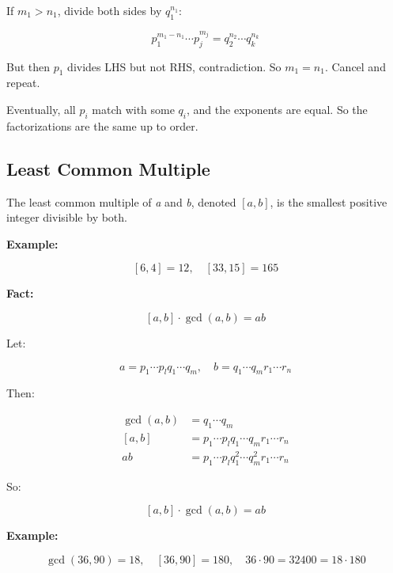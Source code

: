 If \(m_1 > n_1\), divide both sides by \(q_1^{n_1}\):

\[
	p_1^{m_1-n_1} \cdots p_j^{m_j} = q_2^{n_2} \cdots q_k^{n_k}
\]

But then \(p_1\) divides LHS but not RHS, contradiction. So \(m_1 = n_1\). Cancel and repeat.
\vspace{\baselineskip}

Eventually, all \(p_i\) match with some \(q_i\), and the exponents are equal. So the factorizations 
are the same up to order.

\QED

\subsection{Least Common Multiple}

The least common multiple of \emph{a} and \emph{b}, denoted \([a, b]\), is the smallest positive integer 
divisible by both.
\vspace{\baselineskip}

\textbf{Example:}
\vspace{\baselineskip}

\[
	[6, 4] = 12, \quad [33, 15] = 165
\]

\textbf{Fact:}

\[
	[a, b] \cdot \gcd(a, b) = ab
\]

Let:

\[
	a = p_1 \cdots p_lq_1 \cdots q_m, \quad b = q_1 \cdots q_mr_1 \cdots r_n
\]

Then:

\begin{align*}
	\gcd(a, b) & = q_1 \cdots q_m                                 \\
	[a, b]     & = p_1 \cdots p_lq_1 \cdots q_mr_1 \cdots r_n     \\
	ab         & = p_1 \cdots p_lq_1^2 \cdots q_m^2r_1 \cdots r_n
\end{align*}

So:

\[
	[a, b] \cdot \gcd(a, b) = ab
\]

\textbf{Example:}

\[
	\gcd(36, 90) = 18, \quad [36, 90] = 180, \quad 36 \cdot 90 = 32400 = 18 \cdot 180
\]
